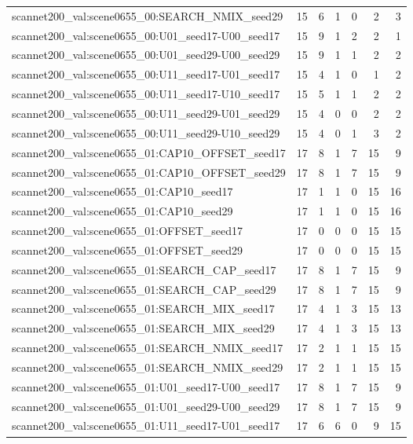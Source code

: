 \begin{table}[t]
\begin{tabular}{lrrrrrr}
scannet200\_val:scene0655\_00:SEARCH\_NMIX\_seed29 & 15 & 6 & 1 & 0 & 2 & 3 \\
scannet200\_val:scene0655\_00:U01\_seed17-U00\_seed17 & 15 & 9 & 1 & 2 & 2 & 1 \\
scannet200\_val:scene0655\_00:U01\_seed29-U00\_seed29 & 15 & 9 & 1 & 1 & 2 & 2 \\
scannet200\_val:scene0655\_00:U11\_seed17-U01\_seed17 & 15 & 4 & 1 & 0 & 1 & 2 \\
scannet200\_val:scene0655\_00:U11\_seed17-U10\_seed17 & 15 & 5 & 1 & 1 & 2 & 2 \\
scannet200\_val:scene0655\_00:U11\_seed29-U01\_seed29 & 15 & 4 & 0 & 0 & 2 & 2 \\
scannet200\_val:scene0655\_00:U11\_seed29-U10\_seed29 & 15 & 4 & 0 & 1 & 3 & 2 \\
scannet200\_val:scene0655\_01:CAP10\_OFFSET\_seed17 & 17 & 8 & 1 & 7 & 15 & 9 \\
scannet200\_val:scene0655\_01:CAP10\_OFFSET\_seed29 & 17 & 8 & 1 & 7 & 15 & 9 \\
scannet200\_val:scene0655\_01:CAP10\_seed17 & 17 & 1 & 1 & 0 & 15 & 16 \\
scannet200\_val:scene0655\_01:CAP10\_seed29 & 17 & 1 & 1 & 0 & 15 & 16 \\
scannet200\_val:scene0655\_01:OFFSET\_seed17 & 17 & 0 & 0 & 0 & 15 & 15 \\
scannet200\_val:scene0655\_01:OFFSET\_seed29 & 17 & 0 & 0 & 0 & 15 & 15 \\
scannet200\_val:scene0655\_01:SEARCH\_CAP\_seed17 & 17 & 8 & 1 & 7 & 15 & 9 \\
scannet200\_val:scene0655\_01:SEARCH\_CAP\_seed29 & 17 & 8 & 1 & 7 & 15 & 9 \\
scannet200\_val:scene0655\_01:SEARCH\_MIX\_seed17 & 17 & 4 & 1 & 3 & 15 & 13 \\
scannet200\_val:scene0655\_01:SEARCH\_MIX\_seed29 & 17 & 4 & 1 & 3 & 15 & 13 \\
scannet200\_val:scene0655\_01:SEARCH\_NMIX\_seed17 & 17 & 2 & 1 & 1 & 15 & 15 \\
scannet200\_val:scene0655\_01:SEARCH\_NMIX\_seed29 & 17 & 2 & 1 & 1 & 15 & 15 \\
scannet200\_val:scene0655\_01:U01\_seed17-U00\_seed17 & 17 & 8 & 1 & 7 & 15 & 9 \\
scannet200\_val:scene0655\_01:U01\_seed29-U00\_seed29 & 17 & 8 & 1 & 7 & 15 & 9 \\
scannet200\_val:scene0655\_01:U11\_seed17-U01\_seed17 & 17 & 6 & 6 & 0 & 9 & 15 \\

\end{tabular}
\end{table}
